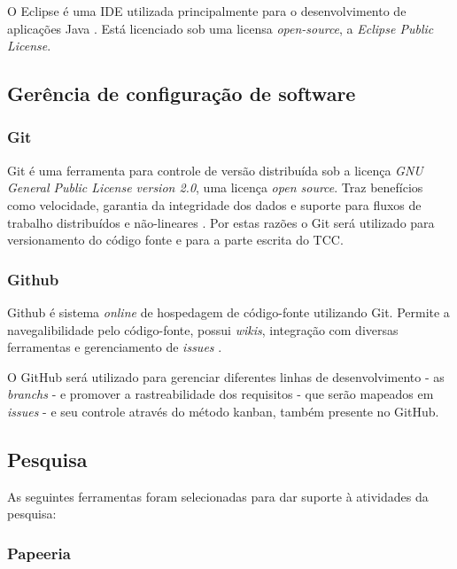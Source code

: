 O Eclipse é uma IDE utilizada principalmente para o desenvolvimento de aplicações Java \cite{eclipse2016}. Está licenciado sob uma licensa \textit{open-source}, a \textit{Eclipse Public License}. %

\subsection{Gerência de configuração de software}

\subsubsection{Git}

Git é uma ferramenta  para controle de versão distribuída sob a licença \textit{GNU General Public License version 2.0}, uma licença \textit{open source}.  Traz benefícios como velocidade, garantia da integridade dos dados e suporte para fluxos de trabalho distribuídos e não-lineares \cite[pág. 31]{chacon2014}. Por estas razões o Git será utilizado para versionamento do código fonte e para a parte escrita do TCC.

\subsubsection{Github}

Github é sistema \textit{online} de hospedagem de código-fonte utilizando Git. Permite a navegalibilidade pelo código-fonte, possui \textit{wikis}, integração com diversas ferramentas e gerenciamento de \textit{issues} \cite{github2016}.

O GitHub será utilizado para gerenciar diferentes linhas de desenvolvimento - as \textit{branchs} - e promover a rastreabilidade dos requisitos - que serão mapeados em \textit{issues} - e seu controle através do método kanban, também presente no GitHub.

\subsection{Pesquisa}
As seguintes ferramentas foram selecionadas para dar suporte à atividades da pesquisa:

\subsubsection{Papeeria}

